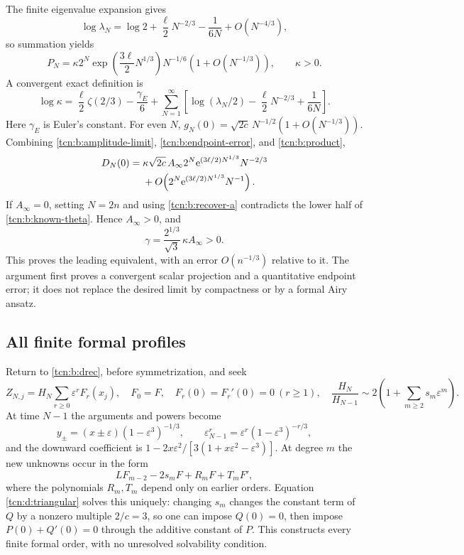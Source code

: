 \documentclass[11pt,letterpaper]{article}
\newcommand{\eps}{\varepsilon}
\newcommand{\ee}{\mathrm e}
\theoremstyle{remark}
\begin{document}
The finite eigenvalue expansion gives
\[
 \log\lambda_N=\log2+\frac\ell2N^{-2/3}-\frac1{6N}+O(N^{-4/3}),
\]
so summation yields
\begin{equation}
 P_N=\kappa 2^N\exp\!\left(\frac{3\ell}2N^{1/3}\right)
       N^{-1/6}(1+O(N^{-1/3})),\qquad\kappa>0.              \label{tcn:b:product}
\end{equation}
A convergent exact definition is
\begin{equation}
 \log\kappa=\frac\ell2\zeta(2/3)-\frac{\gamma_E}6
 +\sum_{N=1}^\infty\left[\log(\lambda_N/2)
                 -\frac\ell2N^{-2/3}+\frac1{6N}\right].    \label{tcn:b:kappa}
\end{equation}
Here $\gamma_E$ is Euler's constant. For even $N$,
$g_N(0)=\sqrt{2c}\,N^{-1/2}(1+O(N^{-1/3}))$. Combining
\eqref{tcn:b:amplitude-limit}, \eqref{tcn:b:endpoint-error}, and \eqref{tcn:b:product},
\begin{align}
 D_N(0)={}&\kappa\sqrt{2c}\,A_\infty
   2^N\ee^{(3\ell/2)N^{1/3}}N^{-2/3}\notag\\
 &+O\!\left(2^N\ee^{(3\ell/2)N^{1/3}}N^{-1}\right).
 \label{tcn:b:endpoint-leading}
\end{align}
If $A_\infty=0$, setting $N=2n$ and using \eqref{tcn:b:recover-a} contradicts the lower half of \eqref{tcn:b:known-theta}. Hence $A_\infty>0$, and
\begin{equation}
 \boxed{\gamma=\frac{2^{1/3}}{\sqrt3}\,\kappa A_\infty>0.}  \label{tcn:b:gamma}
\end{equation}
This proves the leading equivalent, with an error $O(n^{-1/3})$ relative to it. The argument first proves a convergent scalar projection and a quantitative endpoint error; it does not replace the desired limit by compactness or by a formal Airy ansatz.

\subsection{All finite formal profiles}\label{tcn:b:sec:route6}
Return to \eqref{tcn:b:drec}, before symmetrization, and seek
\begin{equation}
 Z_{N,j}=H_N\sum_{r\ge0}\eps^rF_r(x_j),\quad
 F_0=F,\quad F_r(0)=F_r'(0)=0\ (r\ge1),\quad
 \frac{H_N}{H_{N-1}}\sim2\left(1+\sum_{m\ge2}s_m\eps^m\right).
 \label{tcn:b:formal-profile}
\end{equation}
At time $N-1$ the arguments and powers become
\[
 y_\pm=(x\pm\eps)(1-\eps^3)^{-1/3},\qquad
 \eps_{N-1}^r=\eps^r(1-\eps^3)^{-r/3},
\]
and the downward coefficient is $1-2x\eps^2/[3(1+x\eps^2-\eps^3)]$. At degree $m$ the new unknowns occur in the form
\[
 LF_{m-2}-2s_mF+R_mF+T_mF',
\]
where the polynomials $R_m,T_m$ depend only on earlier orders. Equation \eqref{tcn:d:triangular} solves this uniquely: changing $s_m$ changes the constant term of $Q$ by a nonzero multiple $2/c=3$, so one can impose $Q(0)=0$, then impose $P(0)+Q'(0)=0$ through the additive constant of $P$. This constructs every finite formal order, with no unresolved solvability condition.
\end{document}
